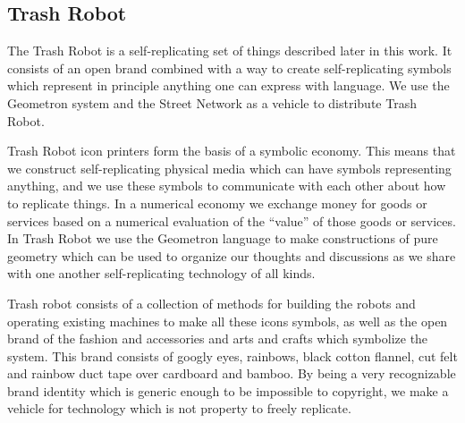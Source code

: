 \subsection{Trash Robot}

The Trash Robot is a self-replicating set of things described later in this work.  It consists of an open brand combined with a way to create self-replicating symbols which represent in principle anything one can express with language.  We use the Geometron system and the Street Network as a vehicle to distribute Trash Robot.    

Trash Robot icon printers form the basis of a symbolic economy.  This means that we construct self-replicating physical media which can have symbols representing anything, and we use these symbols to communicate with each other about how to replicate things. In a numerical economy we exchange money for goods or services based on a numerical evaluation of the ``value'' of those goods or services.  In Trash Robot we use the Geometron language to make constructions of pure geometry which can be used to organize our thoughts and discussions as we share with one another self-replicating technology of all kinds.

Trash robot consists of a collection of methods for building the robots and operating existing machines to make all these icons symbols, as well as the open brand of the fashion and accessories and arts and crafts which symbolize the system.  This brand consists of googly eyes, rainbows, black cotton flannel, cut felt and rainbow duct tape over cardboard and bamboo.  By being a very recognizable brand identity which is generic enough to be impossible to copyright, we make a vehicle for technology which is not property to freely replicate.


